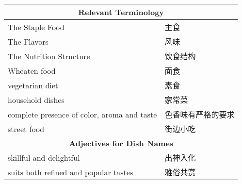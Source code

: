 \begin{longtable}{|p{7cm}|p{7cm}|}
    \multicolumn{2}{c}{\textbf{Relevant Terminology}} \\ \hline
    The Staple Food & 主食 \\ \hline
    The Flavors & 风味 \\ \hline
    The Nutrition Structure & 饮食结构 \\ \hline
    Wheaten food & 面食 \\ \hline
    vegetarian diet & 素食 \\ \hline
    household dishes & 家常菜 \\ \hline
    complete presence of color, aroma and taste & 色香味有严格的要求 \\ \hline
    street food & 街边小吃 \\ \hline
    
    \multicolumn{2}{c}{\textbf{Adjectives for Dish Names}} \\ \hline
    skillful and delightful & 出神入化 \\ \hline
    suits both refined and popular tastes & 雅俗共赏 \\ \hline
    

\end{longtable}
